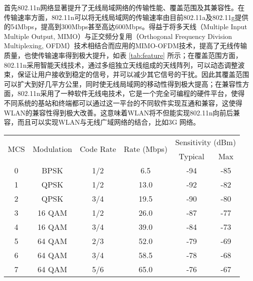 首先802.11n网络显著提升了无线局域网络的传输性能、覆盖范围及其兼容性。在传输速率方面，802.11n可以将无线局域网的传输速率由目前802.11a及802.11g提供的54Mbps，提高到300Mbps甚至高达600Mbps。得益于将多天线（Multiple Input Multiple Output, MIMO）与正交频分复用（Orthogonal Frequency Division Multiplexing, OFDM）技术相结合而应用的MIMO-OFDM技术，提高了无线传输质量，也使传输速率得到极大提升，如表 \ref{tab:feature} 所示；在覆盖范围方面，802.11n采用智能天线技术，通过多组独立天线组成的天线阵列，可以动态调整波束，保证让用户接收到稳定的信号，并可以减少其它信号的干扰。因此其覆盖范围可以扩大到好几平方公里，同时使无线局域网的移动性得到极大提高；在兼容性方面，802.11n采用了一种软件无线电技术，它是一个完全可编程的硬件平台，使得不同系统的基站和终端都可以通过这一平台的不同软件实现互通和兼容，这使得WLAN的兼容性得到极大改善。这意味着WLAN将不但能实现802.11n向前后兼容，而且可以实现WLAN与无线广域网络的结合，比如3G 网络。

\begin{table}[!htp]
\renewcommand{\arraystretch}{1}
\centering
\begin{threeparttable}[b]
\begin{tabular}{cccccc}
\hline
  \multirow{2}{*}{MCS} & \multirow{2}{*}{Modulation} & \multirow{2}{*}{Code Rate} & \multirow{2}{*}{Rate (Mbps)} & \multicolumn{2}{c}{Sensitivity (dBm)} \\
\cline{5-6}
  & & & & Typical & Max \\
\hline
  0 & BPSK & 1/2 & 6.5 & -94 & -85 \\
  1 & QPSK & 1/2 & 13.0 & -92 & -82 \\
  2 & QPSK & 3/4 & 19.5 & -90 & -80 \\
  3 & 16 QAM & 1/2 & 26.0 & -87 & -77 \\
  4 & 16 QAM & 3/4 & 39.0 & -84 & -73 \\
  5 & 64 QAM & 2/3 & 52.0 & -79 & -69 \\
  6 & 64 QAM & 3/4 & 58.5 & -78 & -68 \\
  7 & 64 QAM & 5/6 & 65.0 & -76 & -67 \\
\hline
\end{tabular}
\end{threeparttable}
\end{table}

